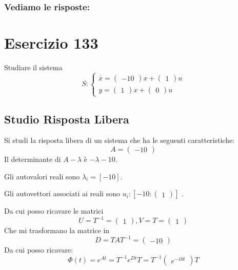 \documentclass{article}
\begin{document}
\subsubsection{Vediamo le risposte:} 
\section{Esercizio 133 }
 Studiare il sistema \[S:\begin{cases}\overset{\cdot}{x} = \left(\begin{matrix}-10\end{matrix}\right) x+ \left(\begin{matrix}1\end{matrix}\right)u\\y = \left(\begin{matrix}1\end{matrix}\right) x +\left(\begin{matrix}0\end{matrix}\right) u\end{cases}\]\subsection{Studio Risposta Libera}
Si studi la risposta libera di un sistema che ha le seguenti caratteristiche: \[A = \left(\begin{matrix}-10\end{matrix}\right)\]
Il determinante di $A-\lambda$ è $ - \lambda - 10 $.

Gli autovalori reali sono $\lambda_i = [-10]$.

Gli autovettori associati ai reali sono $ u_i: [  -10: \left(\begin{matrix}1\end{matrix}\right) ]$
.

Da cui posso ricavare le matrici \[U=T^{-1} = \left(\begin{matrix}1\end{matrix}\right), V = T = \left(\begin{matrix}1\end{matrix}\right)\]
Che mi trasformano la matrice in \[ D = TAT^{-1} = \left(\begin{matrix}-10\end{matrix}\right) \]
Da cui posso ricavare: \[ \Phi(t) = e^{At} = T^{-1} e^{Dt} T =  T^{-1} \left(\begin{matrix}e^{- 10 t}\end{matrix}\right) T\]
\end{document}
